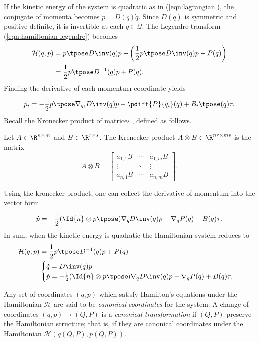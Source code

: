 If the kinetic energy of the system is quadratic as in (\ref{eqn:lagrangian}), 
the conjugate of momenta becomes \(p = D(q)\dot{q}\). Since \(D(q)\) is symmetric
and positive definite, it is invertible at each \(q \in \mathcal{Q}\).
The Legendre transform (\ref{eqn:hamiltonian-legendre}) becomes
\begin{align*}
    \mathcal{H}(q,p) &= p\tpose D\inv(q)p - \left( \frac{1}{2}p\tpose D\inv(q) p -
    P(q) \right) \\
         &= \frac{1}{2} p\tpose D^{-1}(q) p + P(q)
    .
\end{align*}
Finding the derivative of each momentum coordinate yields
\[
    \dot{p}_i = -\frac{1}{2} p\tpose \nabla_{q_i}D\inv(q) p 
        - \pdiff{P}{q_i}(q) + B_i\tpose(q) \tau
    .
\]
Recall the Kronecker product of matrices \cite{kronprod}, defined as follows.
\begin{defn}
    Let \(A \in \R^{n \times m}\) and \(B \in \R^{r \times s}\).
    The Kronecker product \(A \otimes B \in \R^{nr \times ms}\) is the  matrix
    \[
        A \otimes B = \begin{bmatrix}
            a_{1,1}B & \cdots & a_{1,m} B \\
            \vdots & \ddots & \vdots \\
            a_{n,1} B & \cdots & a_{n,m} B
        \end{bmatrix} 
        .
    \]
\end{defn}
Using the kronecker product, one can collect the derivative of momentum into
the vector form
\[
    \dot{p} = -\frac{1}{2} (\Id{n} \otimes p\tpose) \nabla_q D\inv(q) p
    - \nabla_q P(q) + B(q) \tau
    .
\]
In sum, when the kinetic energy is quadratic the Hamiltonian system reduces to
\begin{align}\label{eqn:hamiltonian}
    \mathcal{H}(q,p) &= \frac{1}{2} p\tpose D^{-1}(q) p + P(q)
    , \\
     &\begin{cases}
        \dot{q} = D\inv(q)p \\
        \dot{p} = -\frac{1}{2} (\Id{n} \otimes p\tpose) \nabla_q D\inv(q) p
        - \nabla_q P(q) + B(q) \tau
        . \\
    \end{cases} \label{eqn:hamiltonian-full-dynamics}
\end{align}

Any set of coordinates \((q,p)\) which satisfy Hamilton's equations 
under the Hamiltonian \(\mathcal{H}\) are
said to be \textit{canonical coordinates} for the system. A change of
coordinates \((q,p) \rightarrow (Q,P)\) is a \textit{canonical
transformation} if \((Q,P)\) preserve the Hamiltonian structure; that is, if
they are canonical coordinates under the Hamiltonian
\(\mathcal{H}\left(q(Q,P), p(Q,P)\right)\).

